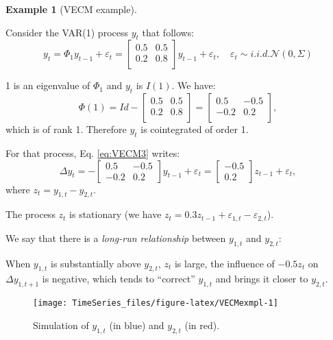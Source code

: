 \documentclass[
  12pt,
]{book}
\theoremstyle{definition}
\theoremstyle{definition}
\newtheorem{example}{Example}[chapter]
\theoremstyle{definition}
\theoremstyle{definition}
\theoremstyle{remark}
\begin{document}
\begin{example}[VECM example]
\protect\hypertarget{exm:ExampleVECM1}{}\label{exm:ExampleVECM1}

Consider the VAR(1) process \(y_t\) that follows:
\[
y_t = \Phi_1 y_{t-1} + \varepsilon_t = \left[\begin{array}{cc}
0.5 & 0.5 \\
0.2 & 0.8 \\
\end{array}
\right] y_{t-1} + \varepsilon_t, \quad \varepsilon_t \sim i.i.d. \mathcal{N}(0,\Sigma)
\]

1 is an eigenvalue of \(\Phi_1\) and \(y_t\) is \(I(1)\). We have:
\[
\Phi(1) = Id - \left[\begin{array}{cc}
0.5 & 0.5 \\
0.2 & 0.8 \\
\end{array}
\right] = \left[\begin{array}{cc}
0.5 & -0.5 \\
-0.2 & 0.2 \\
\end{array}
\right],
\]
which is of rank 1. Therefore \(y_t\) is cointegrated of order 1.

For that process, Eq. \eqref{eq:VECM3} writes:
\[
\Delta y_{t} =
- \left[\begin{array}{cc}
0.5 & -0.5 \\
-0.2 & 0.2
\end{array}
\right] y_{t-1} + \varepsilon_t =
\left[\begin{array}{c}
-0.5\\
0.2
\end{array}
\right] z_{t-1} + \varepsilon_t,
\]
where \(z_{t} = y_{1,t}-y_{2,t}\).

The process \(z_t\) is stationary (we have \(z_t = 0.3 z_{t-1} + \varepsilon_{1,t} - \varepsilon_{2,t}\)).

We say that there is a \emph{long-run relationship} between \(y_{1,t}\) and \(y_{2,t}\):

When \(y_{1,t}\) is substantially above \(y_{2,t}\), \(z_t\) is large, the influence of \(-0.5 z_t\) on \(\Delta y_{1,t+1}\) is negative, which tends to ``correct'' \(y_{1,t}\) and brings it closer to \(y_{2,t}\).

\begin{figure}
\texttt{[image: TimeSeries\_files/figure-latex/VECMexmpl-1]} \caption{Simulation of $y_{1,t}$ (in blue) and $y_{2,t}$ (in red).}\label{fig:VECMexmpl}
\end{figure}

\end{example}
\end{document}
